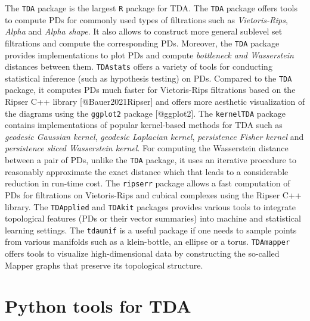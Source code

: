 \documentclass{article}
\begin{document}
The \texttt{TDA} package is the largest \texttt{R} package for TDA. The \texttt{TDA} package offers tools to compute PDs for commonly used types of filtrations such as \emph{Vietoris-Rips}, \emph{Alpha} and \emph{Alpha shape}. It also allows to construct more general sublevel set filtrations and compute the corresponding PDs. Moreover, the \texttt{TDA} package provides implementations to plot PDs and compute \emph{bottleneck and Wasserstein} distances between them. \texttt{TDAstats} offers a variety of tools for conducting statistical inference (such as hypothesis testing) on PDs. Compared to the \texttt{TDA} package, it computes PDs much faster for Vietoris-Rips filtrations based on the Ripser C++ library [@Bauer2021Ripser] and offers more aesthetic visualization of the diagrams using the \texttt{ggplot2} package [@ggplot2]. The \texttt{kernelTDA} package contains implementations of popular kernel-based methods for TDA such as \emph{geodesic Gaussian kernel}, \emph{geodesic Laplacian kernel}, \emph{persistence Fisher kernel} and \emph{persistence sliced Wasserstein kernel}. For computing the Wasserstein distance between a pair of PDs, unlike the \texttt{TDA} package, it uses an iterative procedure to reasonably approximate the exact distance which that leads to a considerable reduction in run-time cost. The \texttt{ripserr} package allows a fast computation of PDs for filtrations on Vietoris-Rips and cubical complexes using the Ripser C++ library. The \texttt{TDApplied} and \texttt{TDAkit} packages provides various tools to integrate topological features (PDs or their vector summaries) into machine and statistical learning settings. The \texttt{tdaunif} is a useful package if one needs to sample points from various manifolds such as a klein-bottle, an ellipse or a torus. \texttt{TDAmapper} offers tools to visualize high-dimensional data by constructing the so-called Mapper graphs that preserve its topological structure.


\section{Python tools for TDA}
\end{document}

